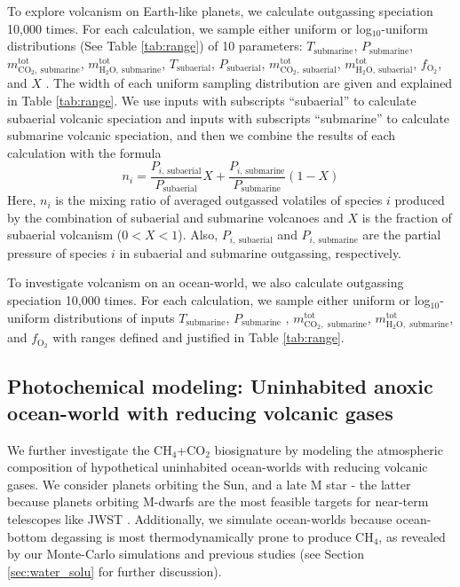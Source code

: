 To explore volcanism on Earth-like planets, we calculate outgassing speciation 10,000 times. For each calculation, we sample either uniform or log$_{10}$-uniform distributions (See Table \ref{tab:range}) of 10 parameters: $T_\mathrm{submarine}$, $P_\mathrm{submarine}$, $m_\mathrm{CO_2, \:\mathrm{submarine}}^{\mathrm{tot}}$, $m_\mathrm{H_2O, \:\mathrm{submarine}}^{\mathrm{tot}}$, $T_\mathrm{subaerial}$, $P_\mathrm{subaerial}$, $m_\mathrm{CO_2,\: \mathrm{subaerial}}^{\mathrm{tot}}$, $m_\mathrm{H_2O,\: \mathrm{subaerial}}^{\mathrm{tot}}$, $f_\mathrm{O_2}$, and $X$ . The width of each uniform sampling distribution are given and explained in Table \ref{tab:range}. We use inputs with subscripts “subaerial” to calculate subaerial volcanic speciation and inputs with subscripts “submarine” to calculate submarine volcanic speciation, and then we combine the results of each calculation with the formula
\begin{equation}
    {n_i} = \frac{{{P_{i{\text{, subaerial}}}}}}{{{P_{\text{subaerial}}}}}X + \frac{{{P_{i{\text{, submarine}}}}}}{{{P_{\text{submarine}}}}}(1 - X)
\end{equation}
Here, $n_i$ is the mixing ratio of averaged outgassed volatiles of species $i$ produced by the combination of subaerial and submarine volcanoes and $X$ is the fraction of subaerial volcanism ($0<X<1$). Also, $P_{i,\mathrm{\:subaerial}}$ and $P_{i,\mathrm{\: submarine}}$ are the partial pressure of species $i$ in subaerial and submarine outgassing, respectively.

To investigate volcanism on an ocean-world, we also calculate outgassing speciation 10,000 times. For each calculation, we sample either uniform or log$_{10}$-uniform distributions of inputs $T_\text{submarine}$, $P_\text{submarine}$ , $m_\mathrm{CO_2, \text{ submarine}}^{\mathrm{tot}}$, $m_\mathrm{H_2O, \text{ submarine}}^{\mathrm{tot}}$, and $f_\mathrm{O_2}$ with ranges defined and justified in Table \ref{tab:range}.

\subsection{Photochemical modeling: Uninhabited anoxic ocean-world with reducing volcanic gases}\label{method:photo}
We further investigate the CH$_4$+CO$_2$ biosignature by modeling the atmospheric composition of hypothetical uninhabited ocean-worlds with reducing volcanic gases. We consider planets orbiting the Sun, and a late M star - the latter because planets orbiting M-dwarfs are the most feasible targets for near-term telescopes like JWST \citep{Barstow_2016}.	Additionally, we simulate ocean-worlds because ocean-bottom degassing is most thermodynamically prone to produce CH$_4$, as revealed by our Monte-Carlo simulations and previous studies \citep{Kasting1998,French_1966} (see Section \ref{sec:water_solu} for further discussion).

